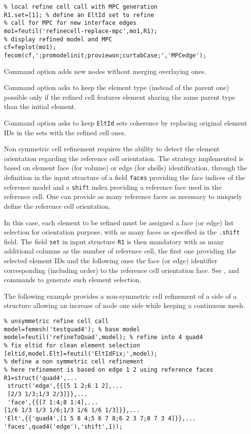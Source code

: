 \begin{itemize}
\begin{verbatim}
% local refine cell call with MPC generation
R1.set=[1]; % define an EltId set to refine
% call for MPC for new interface edges
mo1=feutil('refinecell-replace-mpc',mo1,R1);
% display refined model and MPC
cf=feplot(mo1);
fecom(cf,';promodelinit;proviewon;curtabCase;','MPCedge');
\end{verbatim}%

Command option  adds new nodes without merging overlaying ones.

Command option  asks to keep the element type (instead of the parent one) possible only if the refined cell features element sharing the same parent type than the initial element.

Command option  asks to keep {\tt EltId} sets coherence by replacing original element IDs in the sets with the refined cell ones.

\vs

Non symmetric cell refinement requires the ability to detect the element orientation regarding the reference cell orientation. The strategy implemented is based on element face (for volume) or edge (for shells) identification, through the definition in the input structure of a field {\tt faces} providing the face indices of the reference model and a {\tt shift} index providing a reference face used in the reference cell. One can provide as many reference faces as necessary to uniquely define the reference cell orientation.

In this case, each element to be refined must be assigned a face (or edge) list selection for orientation purpose, with as many faces as specified in the {\tt .shift} field. The field {\tt set} in input structure {\tt R1} is then mandatory with as many additional columns as the number of reference cell, the first one providing the selected element IDs and the following ones the face (or edge) identifier corresponding (including order) to the reference cell orientation face.  See , and  commands to generate such element selection.

The following example provides a non-symmetric cell refinement of a side of a structure allowing an increase of node one side while keeping a continuous mesh.

\begin{verbatim}
% unsymmetric refine cell call
model=femesh('testquad4'); % base model
model=feutil('refineToQuad',model); % refine into 4 quad4
% fix eltid for clean element selection
[eltid,model.Elt]=feutil('EltIdFix;',model);
% define a non symmetric cell refinement
% here refinement is based on edge 1 2 using reference faces
R1=struct('quad4',...
 struct('edge',{{[5 1 2;6 1 2],...
 [2/3 1/3;1/3 2/3]}},...
 'face',{{[7 1:4;8 1:4],...
[1/6 1/3 1/3 1/6;1/3 1/6 1/6 1/3]}},...
'Elt',{{'quad4',[1 5 8 4;5 6 7 8;6 2 3 7;8 7 3 4]}},...
'faces',quad4('edge'),'shift',1));


\end{verbatim}
\end{itemize}
